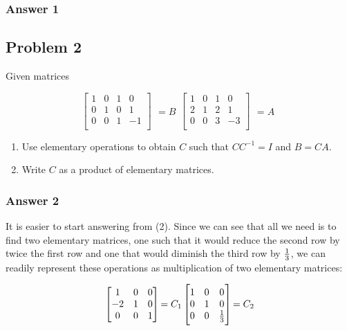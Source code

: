 \documentclass[11pt]{article}
\begin{document}
\subsubsection{Answer 1}
\label{sec-1-1-1}
\subsection{Problem 2}
\label{sec-1-2}

Given matrices

\begin{equation*}
  \begin{bmatrix}
    1 & 0 & 1  & 0 \\
    0 & 1 & 0  & 1 \\
    0 & 0 & 1  & -1 \\
  \end{bmatrix}
  \begin{aligned} = B \end{aligned}
  \begin{bmatrix}
    1 & 0 & 1  & 0 \\
    2 & 1 & 2  & 1 \\
    0 & 0 & 3  & -3 \\
  \end{bmatrix}
  \begin{aligned} = A \end{aligned}
\end{equation*}

\begin{enumerate}
\item Use elementary operations to obtain $C$ such that $CC^{-1}=I$ and $B = CA$.
\item Write $C$ as a product of elementary matrices.
\end{enumerate}

\subsubsection{Answer 2}
\label{sec-1-2-1}
It is easier to start answering from (2). Since we can see that all we need
is to find two elementary matrices, one such that it would reduce the second
row by twice the first row and one that would diminish the third row by
${1\over 3}$, we can readily represent these operations as multiplication
of two elementary matrices:

\begin{equation*}
  \begin{bmatrix}
    1 & 0 & 0 \\
    -2 & 1 & 0 \\
    0 & 0 & 1 \\
  \end{bmatrix}
  \begin{aligned} = C_1 \end{aligned}
  \begin{bmatrix}
    1 & 0 & 0 \\
    0 & 1 & 0 \\
    0 & 0 & {1\over 3} \\
  \end{bmatrix}
  \begin{aligned} = C_2 \end{aligned}
\end{equation*}
\end{document}
